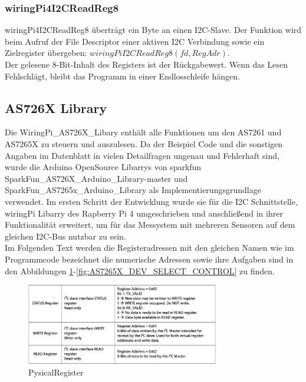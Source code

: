 \subsubsection{wiringPi4I2CReadReg8}
wiringPi4I2CReadReg8 überträgt ein Byte an einen I2C-Slave.
Der Funktion wird beim Aufruf der File Descriptor einer aktiven I2C Verbindung sowie ein Zielregister übergeben: $wiringPiI2CReadReg8(fd, RegAdr)$.\\
Der gelesene 8-Bit-Inhalt des Registers ist der Rückgabewert.
Wenn das Lesen Fehlschlägt, bleibt das Programm in einer Endlosschleife hängen.

\subsection{AS726X Library}\label{AS726X-Library}
Die WiringPi\_AS726X\_Libary enthält alle Funktionen um den AS7261 und AS7265X zu steuern und auszulesen.
Da der Beispiel Code und die sonstigen Angaben im Datenblatt in vielen Detailfragen ungenau und Fehlerhaft sind, wurde die Arduino OpenSource Libarrys von sparkfun SparkFun\_AS726X\_Arduino\_Library-master und SparkFun\_AS7265x\_Arduino\_Library als Implementierungsgrundlage verwendet.
Im ersten Schritt der Entwicklung wurde sie für die I2C Schnittstelle, wiringPi Libarry des Rapberry Pi 4 umgeschrieben und anschließend in ihrer Funktionalität erweitert, um für das Messystem mit mehreren Sensoren auf dem gleichen I2C-Bus nutzbar zu sein. \\

\noindent Im Folgenden Text werden die Registeradressen mit den gleichen Namen wie im Programmcode bezeichnet die numerische Adressen sowie ihre Aufgaben sind in den Abbildungen \ref{fig:PysicalRegister}-\ref{fig:AS7265X_DEV_SELECT_CONTROL} zu finden.

\begin{figure}[H]
\centering
\includegraphics[width=0.75\textwidth]{img/PysicalRegister}
\caption{PysicalRegister\cite{Datenblatt_AS7261}}
\label{fig:PysicalRegister}
\end{figure}

